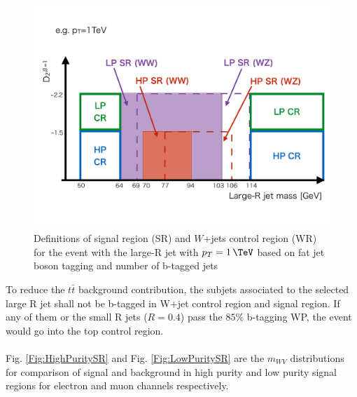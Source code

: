\begin{figure}[h]
	\centering
	\includegraphics[width=0.8\hsize]{Chapter3/HPLPdefinitions}
	\caption{Definitions of signal region (SR) and $W$+jets control region (WR) for the event with the large-R jet with $\pt=1\,\TeV$ based on fat jet boson tagging and number of b-tagged jets }
	\label{Fig:HPLPdefinitions}
\end{figure}
\noindent
To reduce the $t\bar{t}$ background contribution, the subjets associated to the selected large R jet shall not be b-tagged in W+jet control region and signal region. If any of them or the small R jets ($R=0.4$) pass the $85\%$ b-tagging WP, the event would go into the top control region. 
\\
\\Fig. \ref{Fig:HighPuritySR} and Fig. \ref{Fig:LowPuritySR} are the $m_{WV}$ distributions for comparison of signal and background in high purity and low purity signal regions for electron and muon channels respectively. 
